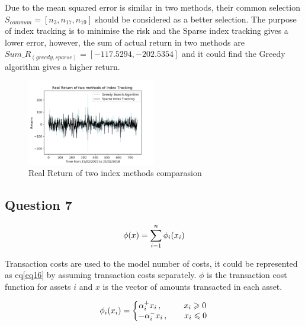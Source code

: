 \documentclass[sigconf]{acmart}
\begin{document}
Due to the mean squared error is similar in two methods, their common selection $S_{common}=[n_{3},n_{17},n_{19}]$ should be considered as a better selection. The purpose of index tracking is to minimise the risk and the Sparse index tracking gives a lower error, however, the sum of actual return in two methods are $Sum\_R_{(greedy,sparse)}=[-117.5294,-202.5354]$ and it could find the Greedy algorithm gives a higher return.

\begin{figure}[htbp]
    \centering
    \includegraphics[width=0.5\textwidth]{11.png}
    \caption{\label{}Real Return of two index methods comparasion}
\end{figure}


\subsection{Question 7}

\begin{equation} \label{eq16}
\setlength{\abovedisplayskip}{3pt}
\setlength{\belowdisplayskip}{3pt}
\phi(x)=\sum_{i=1}^{n}\phi_{i}(x_{i})
\end{equation}

Transaction costs are used to the model number of costs, it could be represented as eq\eqref{eq16} by assuming transaction costs separately. $\phi$ is the transaction cost function for assets $i$ and $x$ is the vector of amounts transacted in each asset\cite{lobo2007portfolio}.

\begin{equation} \label{eq17}
\setlength{\abovedisplayskip}{3pt}
\setlength{\belowdisplayskip}{3pt}
\phi_{i}(x_{i})=\left\{\begin{matrix}
\alpha_{i}^{+}x_{i}\,, \qquad\ \ x_{i}\geqslant 0
\\ -\alpha_{i}^{-}x_{i}\,, \qquad x_{i}\leqslant 0
\end{matrix}\right.
\end{equation}
\end{document}
